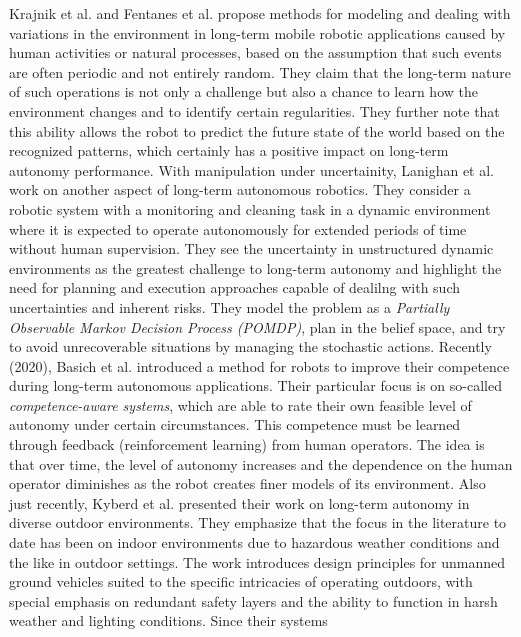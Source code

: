 \documentclass[english, master, utf8]{base/thesis_KBS}
\begin{document}
Krajnik et al. \cite{Krajnik:2019} and Fentanes et al. \cite{Fentanes:2015} propose methods for modeling and dealing with variations in the environment in long-term mobile robotic
applications caused by human activities or natural processes, based on the assumption that such events are often periodic and not entirely random. They claim that the long-term
nature of such operations is not only a challenge but also a chance to learn how the environment changes and to identify certain regularities. They further note that this ability
allows the robot to predict the future state of the world based on the recognized patterns, which certainly has a positive impact on long-term autonomy performance.\newline
With manipulation under uncertainity, Lanighan et al. \cite{Lanighan:2019} work on another aspect of long-term autonomous robotics. They consider a robotic system with a monitoring and
cleaning task in a dynamic environment where it is expected to operate autonomously for extended periods of time without human supervision. They see the uncertainty in unstructured
dynamic environments as the greatest challenge to long-term autonomy and highlight the need for planning and execution approaches capable of dealilng with such uncertainties and
inherent risks. They model the problem as a \textit{Partially Observable Markov Decision Process (POMDP)}, plan in the belief space, and try to avoid unrecoverable situations by
managing the stochastic actions.\newline
Recently (2020), Basich et al. \cite{Basich:2020} introduced a method for robots to improve their competence during long-term autonomous applications. Their particular focus is on so-called
\textit{competence-aware systems}, which are able to rate their own feasible level of autonomy under certain circumstances. This competence must be learned through feedback
(reinforcement learning) from human operators. The idea is that over time, the level of autonomy increases and the dependence on the human operator diminishes as the robot creates
finer models of its environment.\newline
Also just recently, Kyberd et al. \cite{Kyberd:2021} presented their work on long-term autonomy in diverse outdoor environments. They emphasize that the focus in the literature to date
has been on indoor environments due to hazardous weather conditions and the like in outdoor settings. The work introduces design principles for unmanned ground vehicles suited to the specific
intricacies of operating outdoors, with special emphasis on redundant safety layers and the ability to function in harsh weather and lighting conditions. Since their systems
\end{document}

